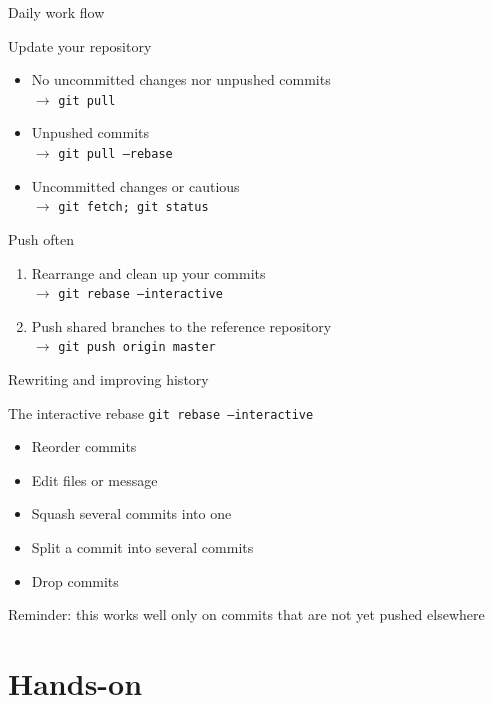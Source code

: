 \documentclass{beamer}
\begin{document}
\begin{frame}{Daily work flow}
  \begin{block}{Update your repository}
    \begin{itemize}
    \item No uncommitted changes nor unpushed commits\\$\rightarrow$ \texttt{git pull}
    \item Unpushed commits\\$\rightarrow$ \texttt{git pull --rebase}
    \item Uncommitted changes or cautious\\$\rightarrow$ \texttt{git fetch; git status}
    \end{itemize}
  \end{block}
  \begin{block}{Push often}
    \begin{enumerate}
    \item Rearrange and clean up your commits\\$\rightarrow$ \texttt{git rebase --interactive}
    \item Push shared branches to the reference repository\\$\rightarrow$ \texttt{git push origin master}
    \end{enumerate}
  \end{block}
\end{frame}

\begin{frame}{Rewriting and improving history}
  \begin{block}{The interactive rebase}
    \texttt{git rebase --interactive}
    \begin{itemize}
    \item Reorder commits
    \item Edit files or message
    \item Squash several commits into one
    \item Split a commit into several commits
    \item Drop commits
    \end{itemize}
    Reminder: this works well only on commits that are \alert{not yet pushed} elsewhere
  \end{block}
\end{frame}

\section{Hands-on}
\end{document}
